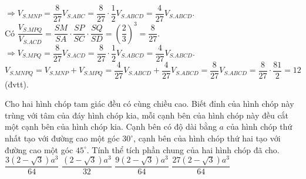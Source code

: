 \begin{ex}
{		$\Rightarrow{V_{S.MNP}}=\dfrac{8}{27}{V_{S.ABC}}=\dfrac{8}{27}\cdot\dfrac{1}{2}{V_{S.ABCD}}=\dfrac{4}{27}{V_{S.ABCD}}$.\\
		Có $\dfrac{V_{S.MPQ}}{V_{S.ACD}}=\dfrac{SM}{SA}\cdot\dfrac{SP}{SC}\cdot\dfrac{SQ}{SD}=\left(\dfrac{2}{3}\right)^3=\dfrac{8}{27}$.\\
		$\Rightarrow{V_{S.MPQ}}=\dfrac{8}{27}{V_{S.ACD}}=\dfrac{8}{27}\cdot\dfrac{1}{2}{V_{S.ABCD}}=\dfrac{4}{27}{V_{S.ABCD}}$.\\
		$V_{S.MNPQ}=V_{S.MNP}+V_{S.MPQ}=\dfrac{4}{27}{V_{S.ABCD}}+\dfrac{4}{27}{V_{S.ABCD}}=\dfrac{8}{27}{V_{S.ABCD}}=\dfrac{8}{27}\cdot\dfrac{81}{2}=12$ (đvtt).
	}
\end{ex}

\begin{ex}%
	[Tiên Du-Bắc Ninh-2020] Cho hai hình chóp tam giác đều có cùng chiều cao. Biết đỉnh của hình chóp này trùng với tâm của đáy hình chóp kia, mỗi cạnh bên của hình chóp này đều cắt một cạnh bên của hình chóp kia. Cạnh bên có độ dài bằng $a$ của hình chóp thứ nhất tạo với đường cao một góc $30^\circ$, cạnh bên của hình chóp thứ hai tạo với đường cao một góc $45^\circ$. Tính thể tích phần chung của hai hình chóp đã cho.
	\choice
	{$\dfrac{3\left(2-\sqrt 3\right){a^3}}{64}$}
	{$\dfrac{\left(2-\sqrt 3\right){a^3}}{32}$}
	{\True $\dfrac{9\left(2-\sqrt 3\right){a^3}}{64}$}
	{$\dfrac{27\left(2-\sqrt 3\right){a^3}}{64}$}
\end{ex}
